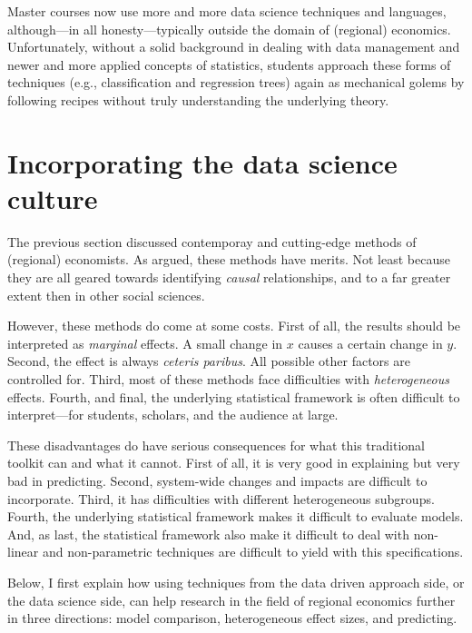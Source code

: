 \documentclass[fleqn,10pt]{SelfArx} %
\begin{document}
Master courses now use more and more data science techniques and languages,
although---in all honesty---typically outside the domain of (regional)
economics. Unfortunately, without a solid background in dealing with data
management and newer and more applied concepts of statistics, students approach these forms of
techniques (e.g., classification and regression trees) again as mechanical
golems by following recipes without truly understanding the underlying theory.   


\section{Incorporating the data science culture\label{agenda}}

The previous section discussed contemporay and cutting-edge methods of (regional)
economists. As argued, these methods have merits. Not least because they are all
geared towards identifying \emph{causal} relationships, and to a far greater
extent then in other social sciences.

However, these methods do come at some costs. First of all, the results should
be interpreted as \emph{marginal} effects. A small change in $x$ causes a
certain change in $y$. Second, the effect is always \emph{ceteris paribus}.
All possible other factors are controlled for. Third, most of these methods face
difficulties with \emph{heterogeneous} effects. Fourth, and final, the underlying
statistical framework is often difficult to interpret---for students, scholars,
and the audience at large.

These disadvantages do have serious consequences for what this traditional
toolkit can and what it cannot. First of all, it is very
good in explaining but very bad in predicting. Second, system-wide changes and
impacts are difficult to incorporate. Third, it has difficulties with different
heterogeneous subgroups. Fourth, the underlying statistical framework makes it
difficult to evaluate models. And, as last, the statistical framework also make
it difficult to deal with non-linear and non-parametric techniques are
difficult to yield with this specifications.

Below, I first explain how using techniques from the data driven approach side, or the
data science side, can help research in  the field of regional economics further in three
directions: model comparison, heterogeneous effect sizes, and predicting.
\end{document}

